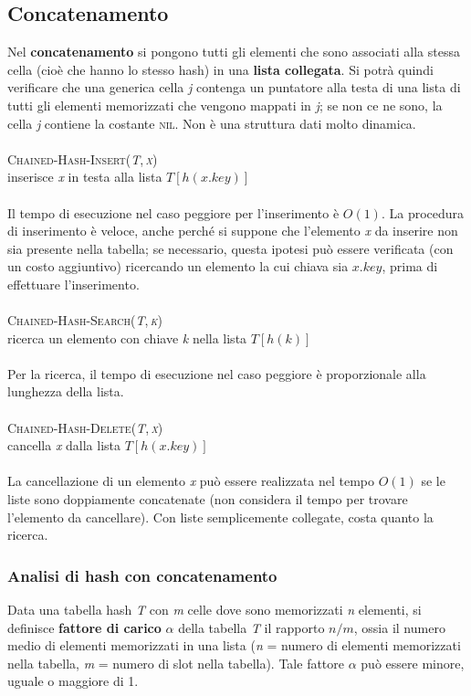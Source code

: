 \documentclass[10pt, a4paper]{report}
\newcommand\firsttab[1][0.5cm]{\hspace*{#1}}
\begin{document}
\subsection{Concatenamento}
Nel \textbf{concatenamento} si pongono tutti gli elementi che sono associati alla stessa cella (cioè che hanno lo stesso hash) in una \textbf{lista collegata}. Si potrà quindi verificare che una generica cella \textit{j}  contenga un puntatore alla testa di una lista di tutti gli elementi memorizzati che vengono mappati in \textit{j}; se non ce ne sono, la cella \textit{j} contiene la costante \textsc{nil}. Non è una struttura dati molto dinamica.\\\\
\textsc{Chained-Hash-Insert(\textit{T},\,\textit{x})}\\
\firsttab inserisce \textit{x} in testa alla lista $T[h(x.key)]$\\\\
Il tempo di esecuzione nel caso peggiore per l'inserimento è $O(1)$. La procedura di inserimento è veloce, anche perché si suppone che l'elemento \textit{x} da inserire non sia presente nella tabella; se necessario, questa ipotesi può essere verificata (con un costo aggiuntivo) ricercando un elemento la cui chiava sia $x.key$, prima di effettuare l'inserimento.\\\\
\textsc{Chained-Hash-Search(\textit{T},\,\textit{k})}\\
\firsttab ricerca un elemento con chiave \textit{k} nella lista $T[h(k)]$\\\\
Per la ricerca, il tempo di esecuzione nel caso peggiore è proporzionale alla lunghezza della lista.\\\\
\textsc{Chained-Hash-Delete(\textit{T},\,\textit{x})}\\
\firsttab cancella \textit{x} dalla lista $T[h(x.key)]$\\\\
La cancellazione di un elemento \textit{x} può essere realizzata nel tempo $O(1)$ se le liste sono doppiamente concatenate (non considera il tempo per trovare l'elemento da cancellare). Con liste semplicemente collegate, costa quanto la ricerca.
\subsubsection{Analisi di hash con concatenamento}
Data una tabella hash \textit{T} con \textit{m} celle dove sono memorizzati \textit{n} elementi, si definisce \textbf{fattore di carico} $\alpha$ della tabella \textit{T} il rapporto $n/m$, ossia il numero medio di elementi memorizzati in una lista (\textit{n} = numero di elementi memorizzati nella tabella, \textit{m} = numero di slot nella tabella). Tale fattore $\alpha$ può essere minore, uguale o maggiore di 1.
\end{document}
